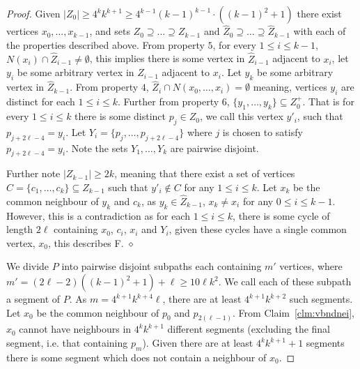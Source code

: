\documentclass[10pt,a4paper]{amsart}
\newenvironment{claimproof}
{\noindent {\em Proof of Claim:} }
{\hfill $\diamond$ \smallskip}
\newcommand{\forbiddenGraph}{F}
\begin{document}
\begin{proof}
\begin{claimproof}
        Given $|Z_0| \geq 4^kk^{k+1} \geq 4^{k-1}(k-1)^{k-1}\cdot ((k-1)^2+1)$ there exist vertices $x_0, \ldots, x_{k-1}$, and sets $Z_{0} \supseteq \ldots \supseteq Z_{k-1}$ and $\hat{Z}_{0} \supseteq \ldots \supseteq \hat{Z}_{k-1}$ with each of the properties described above. From property $5$, for every $1 \leq i \leq k-1$, $N(x_{i}) \cap \hat{Z}_{i-1} \neq \emptyset$, this implies there is some vertex in $\hat{Z}_{i-1}$ adjacent to $x_i$, let $y_i$ be some arbitrary vertex in $\hat{Z}_{i-1}$ adjacent to $x_i$. Let $y_k$ be some arbitrary vertex in $\hat{Z}_{k-1}$. From property $4$, $\hat{Z}_i\cap N(x_0,\dots, x_{i})=\emptyset$ meaning, vertices $y_i$ are distinct for each $1 \leq i \leq k$. Further from property $6$, $\{y_1, \ldots, y_k\} \subseteq Z^+_0$. That is for every $1 \leq i \leq k$ there is some distinct $p_j \in Z_0$, we call this vertex $y'_i$, such that $p_{j+2\ell-4} = y_i$. Let $Y_i = \{p_{j}, \ldots, p_{j+2\ell-4}\}$ where $j$ is chosen to satisfy $p_{j+2\ell-4}=y_i$. Note the sets $Y_1, \ldots, Y_k$ are pairwise disjoint.

        Further note $|Z_{k-1}| \geq 2k$, meaning that there exist a set of vertices $C = \{c_1,\ldots,c_k\} \subseteq Z_{k-1}$ such that $y'_i \notin C$ for any $1 \leq i \leq k$.
        Let $x_k$ be the common neighbour of $y_k$ and $c_k$, as $y_k \in \hat{Z}_{k-1}$, $x_k \neq x_i$ for any $0 \leq i \leq k-1$. However, this is a contradiction as for each $1 \leq i \leq k$, there is some cycle of length $2\ell$ containing $x_0$, $c_i$, $x_i$ and $Y_i$, given these cycles have a single common vertex, $x_0$, this describes \forbiddenGraph.
    \end{claimproof}

    We divide $P$ into pairwise disjoint subpaths each containing $m'$ vertices, where $m' = (2\ell-2)((k-1)^2+1)+\ell \geq 10\ell k^2$. We call each of these subpath a segment of $P$. As $m = 4^{k+1}k^{k+4}\ell$, there are at least $4^{k+1}k^{k+2}$ such segments. Let $x_0$ be the common neighbour of $p_0$ and $p_{2(\ell-1)}$. From Claim~\ref{clm:vbndnei}, $x_0$ cannot have neighbours in $4^kk^{k+1}$ different segments (excluding the final segment, i.e. that containing $p_m$). Given there are at least $4^kk^{k+1}+1$ segments there is some segment which does not contain a neighbour of $x_0$.


\end{proof}
\end{document}
